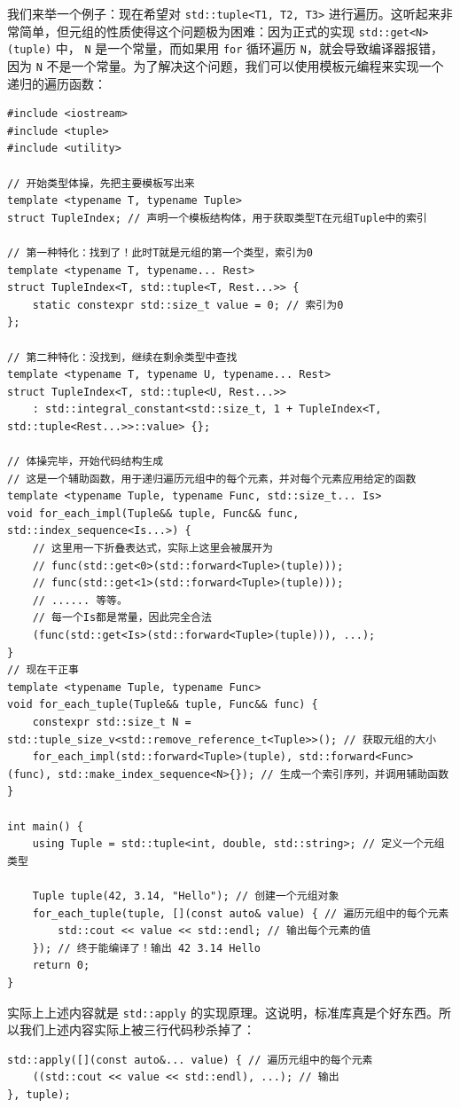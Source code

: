 我们来举一个例子：现在希望对 \verb|std::tuple<T1, T2, T3>| 进行遍历。这听起来非常简单，但元组的性质使得这个问题极为困难：因为正式的实现 \verb|std::get<N>(tuple)| 中， \verb|N| 是一个常量，而如果用 \verb|for| 循环遍历 \verb|N|，就会导致编译器报错，因为 \verb|N| 不是一个常量。为了解决这个问题，我们可以使用模板元编程来实现一个递归的遍历函数：

\begin{verbatim}
#include <iostream>
#include <tuple>
#include <utility>

// 开始类型体操，先把主要模板写出来
template <typename T, typename Tuple>
struct TupleIndex; // 声明一个模板结构体，用于获取类型T在元组Tuple中的索引

// 第一种特化：找到了！此时T就是元组的第一个类型，索引为0
template <typename T, typename... Rest>
struct TupleIndex<T, std::tuple<T, Rest...>> {
    static constexpr std::size_t value = 0; // 索引为0
};

// 第二种特化：没找到，继续在剩余类型中查找
template <typename T, typename U, typename... Rest>
struct TupleIndex<T, std::tuple<U, Rest...>> 
    : std::integral_constant<std::size_t, 1 + TupleIndex<T, std::tuple<Rest...>>::value> {};

// 体操完毕，开始代码结构生成
// 这是一个辅助函数，用于递归遍历元组中的每个元素，并对每个元素应用给定的函数
template <typename Tuple, typename Func, std::size_t... Is>
void for_each_impl(Tuple&& tuple, Func&& func, std::index_sequence<Is...>) {
    // 这里用一下折叠表达式，实际上这里会被展开为
    // func(std::get<0>(std::forward<Tuple>(tuple)));
    // func(std::get<1>(std::forward<Tuple>(tuple)));
    // ...... 等等。
    // 每一个Is都是常量，因此完全合法
    (func(std::get<Is>(std::forward<Tuple>(tuple))), ...);
}
// 现在干正事
template <typename Tuple, typename Func>
void for_each_tuple(Tuple&& tuple, Func&& func) {
    constexpr std::size_t N = std::tuple_size_v<std::remove_reference_t<Tuple>>(); // 获取元组的大小
    for_each_impl(std::forward<Tuple>(tuple), std::forward<Func>(func), std::make_index_sequence<N>{}); // 生成一个索引序列，并调用辅助函数
}

int main() {
    using Tuple = std::tuple<int, double, std::string>; // 定义一个元组类型

    Tuple tuple(42, 3.14, "Hello"); // 创建一个元组对象
    for_each_tuple(tuple, [](const auto& value) { // 遍历元组中的每个元素
        std::cout << value << std::endl; // 输出每个元素的值
    }); // 终于能编译了！输出 42 3.14 Hello
    return 0;
}
\end{verbatim}

实际上上述内容就是 \texttt{std::apply} 的实现原理。这说明，标准库真是个好东西。所以我们上述内容实际上被三行代码秒杀掉了：
\begin{verbatim}
std::apply([](const auto&... value) { // 遍历元组中的每个元素
    ((std::cout << value << std::endl), ...); // 输出
}, tuple); 
\end{verbatim}